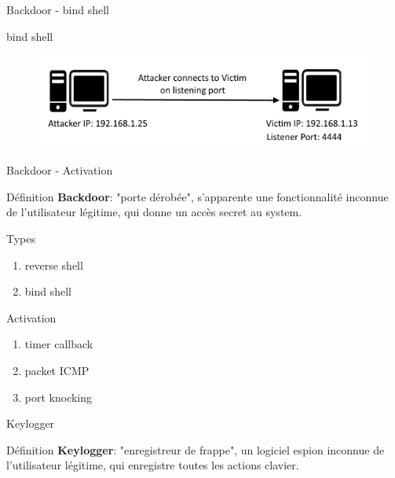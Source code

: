 \documentclass[10pt]{beamer}
\begin{document}
\begin{frame}{Backdoor - bind shell}
	
	\begin{alertblock}{bind shell}
		  \begin{figure}
			\begin{center}
				\includegraphics[scale=0.6]{bind-shell.png}
			\end{center}
  		  \end{figure}
    \end{alertblock}


\end{frame}

\begin{frame}{Backdoor - Activation}
	
	\begin{alertblock}{Définition}
		\textbf{Backdoor}: "porte dérobée", s'apparente une fonctionnalité inconnue de l'utilisateur légitime, qui donne un accès secret au system.
    \end{alertblock}
    
	\begin{alertblock}{Types}
		\begin{enumerate}
			\item reverse shell
			\item bind shell
		\end{enumerate}
    \end{alertblock}
    
	\begin{alertblock}{Activation}
		\begin{enumerate}
			\item timer callback
			\item packet ICMP
			\item port knocking
		\end{enumerate}
    \end{alertblock}


\end{frame}

\begin{frame}{Keylogger}
	
	\begin{alertblock}{Définition}
		\textbf{Keylogger}: "enregistreur de frappe", un logiciel espion inconnue de l'utilisateur légitime, qui enregistre toutes les actions clavier.
    \end{alertblock}

\end{frame}
\end{document}
